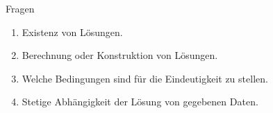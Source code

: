 \begin{genericdf}{Fragen}
\renewcommand{\labelenumi}{\theenumi.}
\begin{enumerate}
\item Existenz von Lösungen.
\item Berechnung oder Konstruktion von Lösungen.
\item Welche Bedingungen sind für die Eindeutigkeit zu stellen.
\item Stetige Abhängigkeit der Lösung von gegebenen Daten.
\end{enumerate}
\end{genericdf}